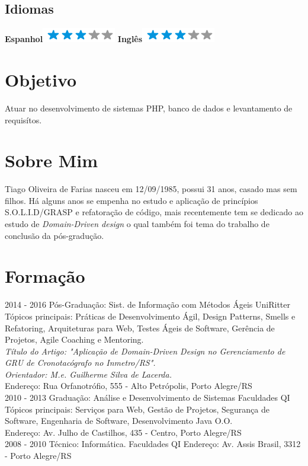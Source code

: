 \documentclass[]{friggeri-cv}
\begin{document}
\begin{aside}
  \section{Idiomas}
    \textbf{Espanhol}\includegraphics[scale=0.40]{img/3stars.png}
    \textbf{Inglês}\includegraphics[scale=0.40]{img/3stars.png}
\end{aside}

\section{Objetivo}
Atuar no desenvolvimento de sistemas PHP, banco de dados e levantamento de requisítos.

\section{Sobre Mim}
Tiago Oliveira de Farias nasceu em 12/09/1985, possui 31 anos, casado mas sem filhos. Há alguns anos se empenha no estudo e aplicação de princípios S.O.L.I.D/GRASP e refatoração de código, mais recentemente tem se dedicado ao estudo de \textit{Domain-Driven design} o qual também foi tema do trabalho de conclusão da pós-gradução.
\section{Formação}
\begin{entrylist}
  \entry
    {2014 - 2016}
    {Pós-Graduação: Sist. de Informação com Métodos Ágeis}
    {UniRitter}
    {Tópicos principais: Práticas de Desenvolvimento Ágil, Design Patterns, Smells e Refatoring, Arquiteturas para Web, Testes Ágeis de Software, Gerência de Projetos, Agile Coaching e Mentoring.\\
    \emph{Título do Artigo: "Aplicação de Domain-Driven Design no Gerenciamento de
GRU de Cronotacógrafo no Inmetro/RS".}\\
    \emph{Orientador: M.e. Guilherme Silva de Lacerda.}\\
    Endereço: Rua Orfanotrófio, 555 - Alto Petrópolis, Porto Alegre/RS\\}
  \entry
    {2010 - 2013}
    {Graduação: Análise e Desenvolvimento de Sistemas}
    {Faculdades QI}
    {Tópicos principais: Serviços para Web, Gestão de Projetos, Segurança de Software, Engenharia de Software, Desenvolvimento Java O.O.\\
    Endereço: Av. Julho de Castilhos, 435 - Centro, Porto Alegre/RS\\}    
  \entry
    {2008 - 2010}
    {Técnico: Informática.}
    {Faculdades QI}
    {Endereço: Av. Assis Brasil, 3312 - Porto Alegre/RS}
\end{entrylist}
\end{document}
